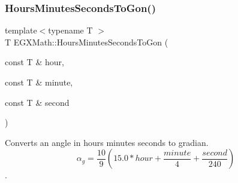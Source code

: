 \subsubsection{\texorpdfstring{Hours\+Minutes\+Seconds\+To\+Gon()}{HoursMinutesSecondsToGon()}}
{\footnotesize\ttfamily template$<$typename T $>$ \\
T E\+G\+X\+Math\+::\+Hours\+Minutes\+Seconds\+To\+Gon (\begin{DoxyParamCaption}\item[{const T \&}]{hour,  }\item[{const T \&}]{minute,  }\item[{const T \&}]{second }\end{DoxyParamCaption})}



Converts an angle in hours minutes seconds to gradian. \[\alpha_{g}=\frac{10}{9}(15.0 * hour + \frac{minute}{4} + \frac{second}{240})\]. 


